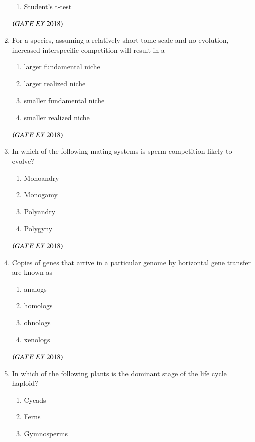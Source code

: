 \documentclass[journal]{IEEEtran}
\numberwithin{equation}{enumi}
\numberwithin{figure}{enumi}
\begin{document}
\begin{enumerate}
\begin{enumerate}
        \item Student's t-test
    \end{enumerate}
    \hfill{$\brak{ GATE\ EY\ 2018}$}
    \bigskip
\item For a species, assuming a relatively short tome scale and no evolution, increased interspecific competition will result in a 
\begin{multicols}{2}
    \begin{enumerate}
        \item larger fundamental niche
        \item larger realized niche
        \item smaller fundamental niche
        \item smaller realized niche
    \end{enumerate}
    \end{multicols}
    \hfill{$\brak{ GATE\ EY\ 2018}$}
    \bigskip
\item In which of the following mating systems is sperm competition likely to evolve?
    \begin{enumerate}
        \item Monoandry
        \item Monogamy
        \item Polyandry
        \item Polygyny
    \end{enumerate}
    \hfill{$\brak{ GATE\ EY\ 2018}$}
    \bigskip
\item Copies of genes that arrive in a particular genome by horizontal gene transfer are
known as
\begin{multicols}{4}
    \begin{enumerate}
        \item analogs
        \item homologs
        \item ohnologs
        \item xenologs
    \end{enumerate}
    \end{multicols}
    \hfill{$\brak{ GATE\ EY\ 2018}$}
    \bigskip
\item In which of the following plants is the dominant stage of the life cycle haploid?
\begin{multicols}{2}
    \begin{enumerate}
        \item Cycads
        \item Ferns
        \item Gymnosperms

\end{enumerate}
\end{multicols}
\end{enumerate}
\end{document}
